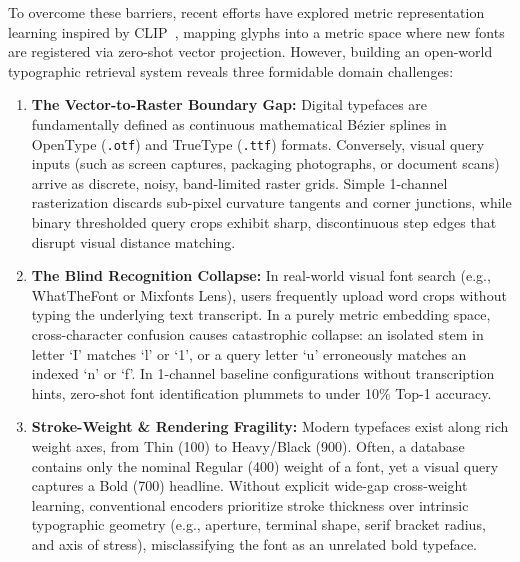 \documentclass[10pt,twocolumn,letterpaper]{article}
\begin{document}
To overcome these barriers, recent efforts have explored metric representation learning inspired by CLIP~\cite{radford2021learning}, mapping glyphs into a metric space where new fonts are registered via zero-shot vector projection. However, building an open-world typographic retrieval system reveals three formidable domain challenges:
\begin{enumerate}
    \item \textbf{The Vector-to-Raster Boundary Gap:} Digital typefaces are fundamentally defined as continuous mathematical B\'ezier splines in OpenType (\texttt{.otf}) and TrueType (\texttt{.ttf}) formats. Conversely, visual query inputs (such as screen captures, packaging photographs, or document scans) arrive as discrete, noisy, band-limited raster grids. Simple 1-channel rasterization discards sub-pixel curvature tangents and corner junctions, while binary thresholded query crops exhibit sharp, discontinuous step edges that disrupt visual distance matching.
    \item \textbf{The Blind Recognition Collapse:} In real-world visual font search (e.g., WhatTheFont or Mixfonts Lens), users frequently upload word crops without typing the underlying text transcript. In a purely metric embedding space, cross-character confusion causes catastrophic collapse: an isolated stem in letter `I' matches `l' or `1', or a query letter `u' erroneously matches an indexed `n' or `f'. In 1-channel baseline configurations without transcription hints, zero-shot font identification plummets to under 10\% Top-1 accuracy.
    \item \textbf{Stroke-Weight \& Rendering Fragility:} Modern typefaces exist along rich weight axes, from Thin (100) to Heavy/Black (900). Often, a database contains only the nominal Regular (400) weight of a font, yet a visual query captures a Bold (700) headline. Without explicit wide-gap cross-weight learning, conventional encoders prioritize stroke thickness over intrinsic typographic geometry (e.g., aperture, terminal shape, serif bracket radius, and axis of stress), misclassifying the font as an unrelated bold typeface.
\end{enumerate}
\end{document}
